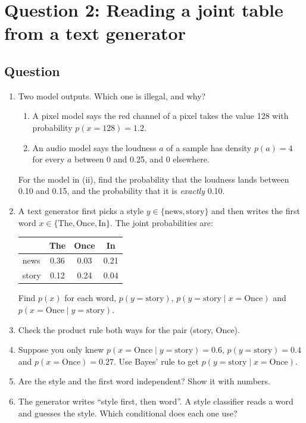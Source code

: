\documentclass[12pt,a4paper]{article}
\begin{document}
\section{Question 2: Reading a joint table from a text generator}

\subsection{Question}

\begin{enumerate}[label=(\alph*)]
  \item Two model outputs. Which one is illegal, and why?
  \begin{enumerate}[label=(\roman*)]
    \item A pixel model says the red channel of a pixel takes the value 128 with probability $p(x=128)=1.2$.
    \item An audio model says the loudness $a$ of a sample has density $p(a)=4$ for every $a$ between 0 and 0.25, and 0 elsewhere.
  \end{enumerate}
  For the model in (ii), find the probability that the loudness lands between 0.10 and 0.15, and the probability that it is \emph{exactly} 0.10.
  \item A text generator first picks a style $y\in\{\text{news},\text{story}\}$ and then writes the first word $x\in\{\text{The},\text{Once},\text{In}\}$. The joint probabilities are:
  \begin{center}
  \begin{tabular}{@{}lccc@{}}
  \toprule
   & The & Once & In \\
  \midrule
  news & 0.36 & 0.03 & 0.21 \\
  story & 0.12 & 0.24 & 0.04 \\
  \bottomrule
  \end{tabular}
  \end{center}
  Find $p(x)$ for each word, $p(y=\text{story})$, $p(y=\text{story}\mid x=\text{Once})$ and $p(x=\text{Once}\mid y=\text{story})$.
  \item Check the product rule both ways for the pair (story, Once).
  \item Suppose you only knew $p(x=\text{Once}\mid y=\text{story})=0.6$, $p(y=\text{story})=0.4$ and $p(x=\text{Once})=0.27$. Use Bayes' rule to get $p(y=\text{story}\mid x=\text{Once})$.
  \item Are the style and the first word independent? Show it with numbers.
  \item The generator writes ``style first, then word''. A style classifier reads a word and guesses the style. Which conditional does each one use?
\end{enumerate}
\end{document}
